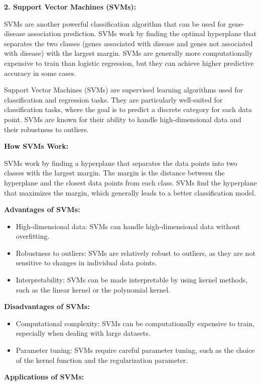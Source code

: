 \textbf{2. Support Vector Machines (SVMs):}

SVMs are another powerful classification algorithm that can be used for gene-disease association prediction. SVMs work by finding the optimal hyperplane that separates the two classes (genes associated with disease and genes not associated with disease) with the largest margin. SVMs are generally more computationally expensive to train than logistic regression, but they can achieve higher predictive accuracy in some cases.

Support Vector Machines (SVMs) are supervised learning algorithms used for classification and regression tasks. They are particularly well-suited for classification tasks, where the goal is to predict a discrete category for each data point. SVMs are known for their ability to handle high-dimensional data and their robustness to outliers.

\textbf{How SVMs Work:}

SVMs work by finding a hyperplane that separates the data points into two classes with the largest margin. The margin is the distance between the hyperplane and the closest data points from each class. SVMs find the hyperplane that maximizes the margin, which generally leads to a better classification model.

\textbf{Advantages of SVMs:}

\begin{itemize}
    \item High-dimensional data: SVMs can handle high-dimensional data without overfitting.

    \item Robustness to outliers: SVMs are relatively robust to outliers, as they are not sensitive to changes in individual data points.

    \item Interpretability: SVMs can be made interpretable by using kernel methods, such as the linear kernel or the polynomial kernel.

\end{itemize}
\textbf{Disadvantages of SVMs:}

\begin{itemize}
    \item Computational complexity: SVMs can be computationally expensive to train, especially when dealing with large datasets.

    \item Parameter tuning: SVMs require careful parameter tuning, such as the choice of the kernel function and the regularization parameter.

\end{itemize}
\textbf{Applications of SVMs:}

